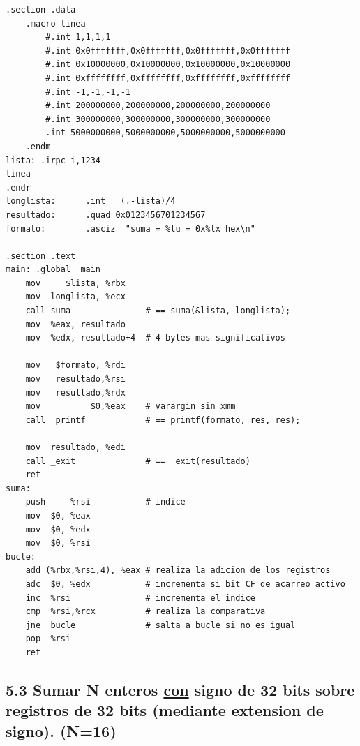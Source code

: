 	\lstset{language=[x64]Assembler}
	\begin{lstlisting}[frame=single]  
.section .data
	.macro linea
		#.int 1,1,1,1
		#.int 0x0fffffff,0x0fffffff,0x0fffffff,0x0fffffff
		#.int 0x10000000,0x10000000,0x10000000,0x10000000
		#.int 0xffffffff,0xffffffff,0xffffffff,0xffffffff
		#.int -1,-1,-1,-1
		#.int 200000000,200000000,200000000,200000000
		#.int 300000000,300000000,300000000,300000000
		.int 5000000000,5000000000,5000000000,5000000000
	.endm
lista: .irpc i,1234
linea
.endr
longlista:      .int   (.-lista)/4
resultado:      .quad 0x0123456701234567
formato:        .asciz  "suma = %lu = 0x%lx hex\n"

.section .text
main: .global  main
	mov     $lista, %rbx
	mov  longlista, %ecx
	call suma               # == suma(&lista, longlista);
	mov  %eax, resultado
	mov  %edx, resultado+4  # 4 bytes mas significativos
	
	mov   $formato, %rdi
	mov   resultado,%rsi
	mov   resultado,%rdx
	mov          $0,%eax    # varargin sin xmm
	call  printf            # == printf(formato, res, res);
	
	mov  resultado, %edi
	call _exit              # ==  exit(resultado)
	ret
suma:
	push     %rsi           # indice
	mov  $0, %eax
	mov  $0, %edx
	mov  $0, %rsi
bucle:
	add (%rbx,%rsi,4), %eax # realiza la adicion de los registros
	adc  $0, %edx           # incrementa si bit CF de acarreo activo
	inc  %rsi               # incrementa el indice
	cmp  %rsi,%rcx          # realiza la comparativa
	jne  bucle              # salta a bucle si no es igual
	pop  %rsi
	ret
	\end{lstlisting}
	
	
	\subsection{5.3 Sumar N enteros \underline{con} signo de 32 bits sobre registros de 32 bits (mediante extension de signo). (N=16)}
	
